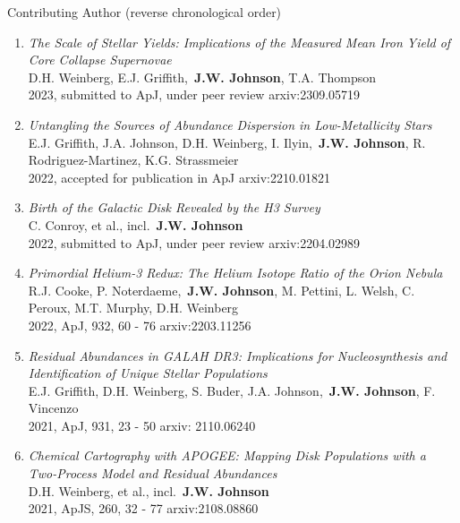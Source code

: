 \documentclass[cv.tex]{subfiles}
\begin{document}
\vspace{5mm}
\par\noindent
{\color{themecolor} \large Contributing Author}
(reverse chronological order)
\par\noindent
\begin{enumerate}

	\vspace{-3mm}

	\item \textit{The Scale of Stellar Yields: Implications of the Measured
	Mean Iron Yield of Core Collapse Supernovae}
	\\
	D.H. Weinberg, E.J. Griffith,~\textbf{J.W. Johnson}, T.A. Thompson
	\\
	2023, submitted to ApJ, under peer review \hfill arxiv:2309.05719

	\item \textit{Untangling the Sources of Abundance Dispersion in
	Low-Metallicity Stars}
	\\
	E.J. Griffith, J.A. Johnson, D.H. Weinberg, I. Ilyin,~\textbf{J.W. Johnson},
	R. Rodriguez-Martinez, K.G. Strassmeier
	\\
	2022, accepted for publication in ApJ \hfill arxiv:2210.01821

	\item \textit{Birth of the Galactic Disk Revealed by the H3 Survey}
	\\
	C. Conroy, et al., incl.~\textbf{J.W. Johnson}
	\\
	2022, submitted to ApJ, under peer review \hfill arxiv:2204.02989

	\item \textit{Primordial Helium-3 Redux: The Helium Isotope Ratio of the
	Orion Nebula}
	\\
	R.J. Cooke, P. Noterdaeme,~\textbf{J.W. Johnson}, M. Pettini, L. Welsh,
	C. Peroux, M.T. Murphy, D.H. Weinberg
	\\
	2022, ApJ, 932, 60 - 76 \hfill arxiv:2203.11256

	\item \textit{Residual Abundances in GALAH DR3: Implications for
	Nucleosynthesis and Identification of Unique Stellar Populations}
	\\
	E.J. Griffith, D.H. Weinberg, S. Buder, J.A. Johnson,~\textbf{J.W. Johnson},
	F. Vincenzo
	\\
	2021, ApJ, 931, 23 - 50 \hfill arxiv: 2110.06240

	\item \textit{Chemical Cartography with APOGEE: Mapping Disk Populations
	with a Two-Process Model and Residual Abundances}
	\\
	D.H. Weinberg, et al., incl.~\textbf{J.W. Johnson}
	\\
	2021, ApJS, 260, 32 - 77 \hfill arxiv:2108.08860


\end{enumerate}
\end{document}

